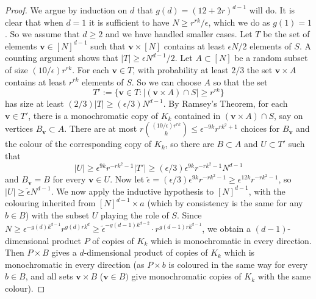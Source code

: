 \documentclass[10pt]{article}
\begin{document}
\begin{proof}
We argue by induction on $d$ that $g(d)=(12+2r)^{d-1}$ will do. It is clear that when $d=1$ it is sufficient to have $N\geq r^{rk}/\epsilon$, which we do as $g(1)=1$. So we assume that $d\geq 2$ and we have handled smaller cases. Let $T$ be the set of elements ${\mathbf v}\in[N]^{d-1}$ such that ${\mathbf v}\times[N]$ contains at least $\epsilon N/2$ elements of $S$. A counting argument shows that $|T|\ge \epsilon N^{d-1}/2$.
Let $A\subset[N]$ be a random subset of size $(10/\epsilon)r^{rk}$. For each ${\mathbf v}\in T$, with probability at least $2/3$ the set $\mathbf v\times A$ contains at least $r^{rk}$ elements of $S$. So we can choose $A$ so that the set
    $$T':=\{ {\mathbf v}\in T: |({\mathbf v}\times A)\cap S|\ge r^{rk}\}$$
has size at least $(2/3)|T|\ge(\epsilon/3)N^{d-1}$.
     By Ramsey's Theorem, for each ${\mathbf v}\in T'$, there is a monochromatic copy of $K_k$ contained in 
$({\mathbf v}\times A)\cap S$, 
say on vertices $B_{\mathbf v}\subset A$. There are at most $r\binom{(10/\epsilon)r^{rk}}{k}\leq \epsilon^{-9k}r^{rk^2+1}$ 
     choices for $B_{\mathbf v}$ and the colour of the corresponding copy of $K_k$, so there are $B\subset A$ and $U\subset T'$ such that
$$|U|\ge \epsilon^{9k}r^{-rk^2-1}|T'| \ge (\epsilon/3)\epsilon^{9k}r^{-rk^2-1}N^{d-1}$$
and $B_{\mathbf v}=B$ for every $\mathbf v\in U$.  
Now let $\tilde{\epsilon}=(\epsilon/3)\epsilon^{9k}r^{-rk^2-1}\ge \epsilon^{12k}r^{-rk^2-1}$, so $|U|\geq \tilde{\epsilon}N^{d-1}$. We now apply the inductive hypothesis to $[N]^{d-1}$, with the colouring inherited from $[N]^{d-1}\times a$ (which by consistency is the same for any $b\in B$) with the subset $U$ playing the role of $S$.
Since $N\geq \epsilon^{-g(d)k^{d-1}}r^{g(d)rk^d}
\geq \tilde{\epsilon}^{-g(d-1)k^{d-2}}\cdot r^{g(d-1)rk^{d-1}}$, 
we obtain a $(d-1)$-dimensional product $P$ of copies of $K_k$ which is monochromatic in every direction.  Then $P\times B$ gives a $d$-dimensional product of copies of $K_k$ which is monochromatic in every direction (as $P\times b$ is coloured in the same way for every $b\in B$, and all sets $\textbf{v}\times B$ ($\textbf{v}\in B)$ give monochromatic copies of $K_k$ with the same colour).
\end{proof}
\end{document}
